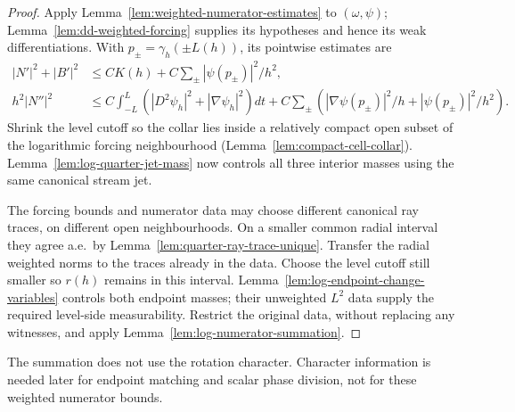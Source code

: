 \begin{proof}
\leanok
Apply Lemma~\ref{lem:weighted-numerator-estimates} to $(\omega,\psi)$;
Lemma~\ref{lem:dd-weighted-forcing} supplies its hypotheses and hence its
weak differentiations. With $p_\pm=\gamma_h(\pm L(h))$, its pointwise
estimates are
\begin{align*}
 |N'|^2+|B'|^2&\le CK(h)+C\sum_\pm|\psi(p_\pm)|^2/h^2,\\
 h^2|N''|^2&\le C\int_{-L}^L(|D^2\psi_h|^2+|\nabla\psi_h|^2)dt
       +C\sum_\pm\left(|\nabla\psi(p_\pm)|^2/h
                                +|\psi(p_\pm)|^2/h^2\right).
\end{align*}
Shrink the level cutoff so the collar lies inside a relatively compact
open subset of the logarithmic forcing neighbourhood
(Lemma~\ref{lem:compact-cell-collar}).
Lemma~\ref{lem:log-quarter-jet-mass} now controls all three interior masses
using the same canonical stream jet.

The forcing bounds and numerator data may choose different canonical ray
traces, on different open neighbourhoods. On a smaller common radial
interval they agree a.e.\ by Lemma~\ref{lem:quarter-ray-trace-unique}.
Transfer the radial weighted norms to the traces already in the data.
Choose the level cutoff still smaller so $r(h)$ remains in this interval.
Lemma~\ref{lem:log-endpoint-change-variables} controls both endpoint masses;
their unweighted $L^2$ data supply the required level-side measurability.
Restrict the original data, without replacing any witnesses, and apply
Lemma~\ref{lem:log-numerator-summation}.
\end{proof}

\begin{remark}
The summation does not use the rotation character.
Character information is needed later for endpoint matching and scalar phase
division, not for these weighted numerator bounds.
\end{remark}

